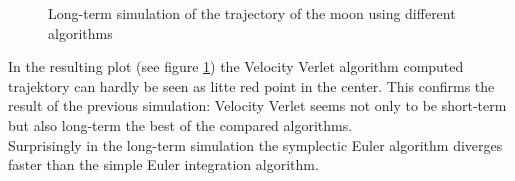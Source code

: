 \documentclass[12pt,a4paper]{scrartcl}
\begin{document}
\begin{figure}[H]
	\resizebox{1\textwidth}{!}{}
	\caption{Long-term simulation of the trajectory of the moon using different algorithms}\label{fig:s4}
\end{figure}

In the resulting plot (see figure \ref{fig:s4}) the Velocity Verlet algorithm computed trajektory can hardly be seen as litte red point in the center. This confirms the result of the previous simulation: Velocity Verlet seems not only to be short-term but also long-term the best of the compared algorithms.\\
Surprisingly in the long-term simulation the symplectic Euler algorithm diverges faster than the simple Euler integration algorithm.
\end{document}

